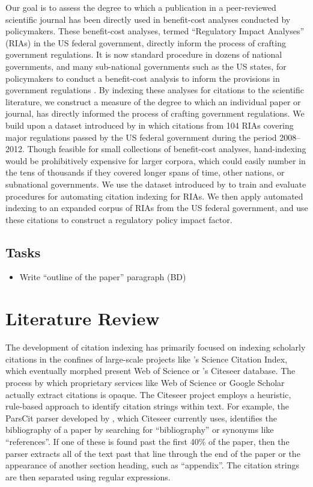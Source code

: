 \documentclass[12pt]{article}
\begin{document}
Our goal is to assess the degree to which a publication in a peer-reviewed scientific journal has been directly used in benefit-cost analyses conducted by policymakers. These benefit-cost analyses, termed ``Regulatory Impact Analyses'' (RIAs) in the US federal government, directly inform the process of crafting government regulations. It is now standard procedure in dozens of national governments, and many sub-national governments such as the US states, for policymakers to conduct a benefit-cost analysis to inform the provisions in government regulations \cite{hahn2007}. By indexing these analyses for citations to the scientific literature, we construct a measure of the degree to which an individual paper or journal, has directly informed the process of crafting government regulations. We build upon a dataset introduced by \cite{desmarais2014} in which citations from 104 RIAs covering major regulations passed by the US federal government during the period 2008--2012. Though feasible for small collections of benefit-cost analyses, hand-indexing would be prohibitively expensive for larger corpora, which could easily number in the tens of thousands if they covered longer spans of time, other nations, or subnational governments. We use the dataset introduced by \cite{desmarais2014} to train and evaluate procedures for automating citation indexing for RIAs. We then apply automated indexing to an expanded corpus of RIAs from the US federal government, and use these citations to construct a regulatory policy impact factor.

\subsection{Tasks}

\begin{itemize}
\item Write ``outline of the paper'' paragraph (BD)


\end{itemize}

\section{Literature Review}
The development of citation indexing has primarily focused on indexing scholarly citations in the confines of large-scale projects like 's Science Citation Index, which eventually morphed present Web of Science or 's Citeseer database. The process by which proprietary services like Web of Science or Google Scholar actually extract citations is opaque. The Citeseer project employs a heuristic, rule-based approach to identify citation strings within text. For example, the ParsCit parser developed by , which Citeseer currently uses, identifies the bibliography of a paper by searching for ``bibliography'' or synonyms like ``references''. If one of these is found past the first 40\% of the paper, then the parser extracts all of the text past that line through the end of the paper or the appearance of another section heading, such as ``appendix''. The citation strings are then separated using regular expressions. 
\end{document}
